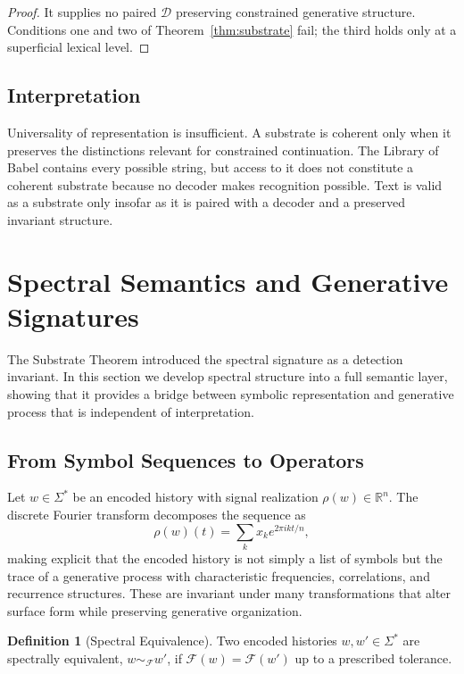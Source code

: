 \documentclass[12pt, a4paper]{article}
\theoremstyle{plain}
\theoremstyle{definition}
\newtheorem{definition}[theorem]{Definition}
\theoremstyle{remark}
\begin{document}
\begin{proof}
It supplies no paired $\mathcal{D}$ preserving constrained generative structure. Conditions one and two of Theorem~\ref{thm:substrate} fail; the third holds only at a superficial lexical level.
\end{proof}

\subsection{Interpretation}

Universality of representation is insufficient. A substrate is coherent only when it preserves the distinctions relevant for constrained continuation. The Library of Babel contains every possible string, but access to it does not constitute a coherent substrate because no decoder makes recognition possible. Text is valid as a substrate only insofar as it is paired with a decoder and a preserved invariant structure.

\section{Spectral Semantics and Generative Signatures}

The Substrate Theorem introduced the spectral signature as a detection invariant. In this section we develop spectral structure into a full semantic layer, showing that it provides a bridge between symbolic representation and generative process that is independent of interpretation.

\subsection{From Symbol Sequences to Operators}

Let $w \in \Sigma^*$ be an encoded history with signal realization $\rho(w) \in \mathbb{R}^n$. The discrete Fourier transform decomposes the sequence as
\[
\rho(w)(t) = \sum_{k} \hat{x}_k e^{2\pi i k t / n},
\]
making explicit that the encoded history is not simply a list of symbols but the trace of a generative process with characteristic frequencies, correlations, and recurrence structures. These are invariant under many transformations that alter surface form while preserving generative organization.

\begin{definition}[Spectral Equivalence]
Two encoded histories $w, w' \in \Sigma^*$ are spectrally equivalent, $w \sim_{\mathcal{F}} w'$, if $\mathcal{F}(w) = \mathcal{F}(w')$ up to a prescribed tolerance.
\end{definition}
\end{document}
